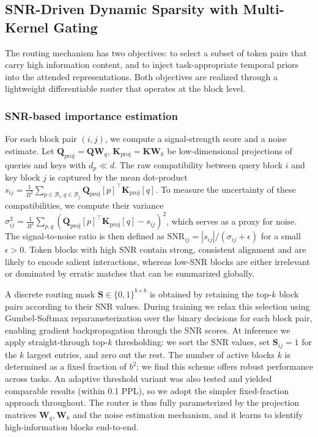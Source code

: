 \documentclass{article}
\begin{document}
\subsection{SNR-Driven Dynamic Sparsity with Multi-Kernel Gating}

The routing mechanism has two objectives: to select a subset of token pairs that carry high information content, and to inject task-appropriate temporal priors into the attended representations. Both objectives are realized through a lightweight differentiable router that operates at the block level.

\subsubsection{SNR-based importance estimation}
For each block pair $(i,j)$, we compute a signal-strength score and a noise estimate. Let $\mathbf{Q}_{\text{proj}}=\mathbf{Q}\mathbf{W}_q$, $\mathbf{K}_{\text{proj}}=\mathbf{K}\mathbf{W}_k$ be low-dimensional projections of queries and keys with $d_p \ll d$. The raw compatibility between query block $i$ and key block $j$ is captured by the mean dot-product $s_{ij} = \frac{1}{B^2}\sum_{p\in\mathcal{B}_i,q\in\mathcal{B}_j} \mathbf{Q}_{\text{proj}}[p]^{\top}\mathbf{K}_{\text{proj}}[q]$. To measure the uncertainty of these compatibilities, we compute their variance $\sigma_{ij}^2 = \frac{1}{B^2}\sum_{p,q} ( \mathbf{Q}_{\text{proj}}[p]^{\top}\mathbf{K}_{\text{proj}}[q] - s_{ij})^2$, which serves as a proxy for noise. The signal-to-noise ratio is then defined as $\text{SNR}_{ij} = |s_{ij}| / (\sigma_{ij} + \epsilon)$ for a small $\epsilon > 0$. Token blocks with high SNR contain strong, consistent alignment and are likely to encode salient interactions, whereas low-SNR blocks are either irrelevant or dominated by erratic matches that can be summarized globally.

A discrete routing mask $\mathbf{S}\in\{0,1\}^{b\times b}$ is obtained by retaining the top-$k$ block pairs according to their SNR values. During training we relax this selection using Gumbel-Softmax reparameterization over the binary decisions for each block pair, enabling gradient backpropagation through the SNR scores. At inference we apply straight-through top-$k$ thresholding: we sort the SNR values, set $\mathbf{S}_{ij}=1$ for the $k$ largest entries, and zero out the rest. The number of active blocks $k$ is determined as a fixed fraction of $b^2$; we find this scheme offers robust performance across tasks. An adaptive threshold variant was also tested and yielded comparable results (within 0.1 PPL), so we adopt the simpler fixed-fraction approach throughout. The router is thus fully parameterized by the projection matrices $\mathbf{W}_q,\mathbf{W}_k$ and the noise estimation mechanism, and it learns to identify high-information blocks end-to-end.
\end{document}
